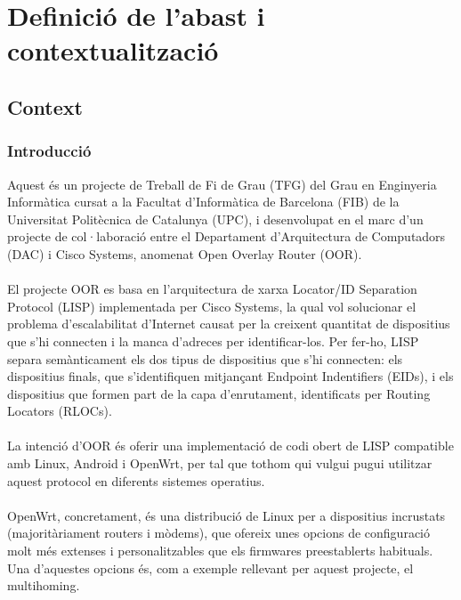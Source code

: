 \documentclass[11pt]{article}
\begin{document}
\newpage
\renewcommand{\thepage}{\roman{page}}
\setcounter{page}{1}
\tableofcontents
\lstlistoflistings
\listoffigures
\newpage
\renewcommand{\thepage}{\arabic{page}}
\setcounter{page}{1}					%
\section{Definició de l'abast i contextualització}
\subsection{Context}
\subsubsection{Introducció}
Aquest és un projecte de Treball de Fi de Grau (TFG) del Grau en Enginyeria Informàtica cursat a la Facultat d’Informàtica de Barcelona (FIB) de la Universitat Politècnica de Catalunya (UPC), i desenvolupat en el marc d’un projecte de col·laboració entre el Departament d’Arquitectura de Computadors (DAC) i Cisco Systems, anomenat Open Overlay Router (OOR).\\
\\
El projecte OOR es basa en l’arquitectura de xarxa Locator/ID Separation Protocol (LISP\cite{dino13}) implementada per Cisco Systems, la qual vol solucionar el problema d’escalabilitat d’Internet causat per la creixent quantitat de dispositius que s’hi connecten i la manca d’adreces per identificar-los. Per fer-ho, LISP separa semànticament els dos tipus de dispositius que s’hi connecten: els dispositius finals, que s’identifiquen mitjançant Endpoint Indentifiers (EIDs), i els dispositius que formen part de la capa d’enrutament, identificats per Routing Locators (RLOCs).\\
\\
La intenció d’OOR és oferir una implementació de codi obert de LISP compatible amb Linux, Android i OpenWrt, per tal que tothom qui vulgui pugui utilitzar aquest protocol en diferents sistemes operatius.\\
\\
OpenWrt, concretament, és una distribució de Linux per a dispositius incrustats (majoritàriament routers i mòdems), que ofereix unes opcions de configuració molt més extenses i personalitzables que els firmwares preestablerts habituals\cite{open16}. Una d’aquestes opcions és, com a exemple rellevant per aquest projecte, el multihoming.\\
\\
\end{document}
